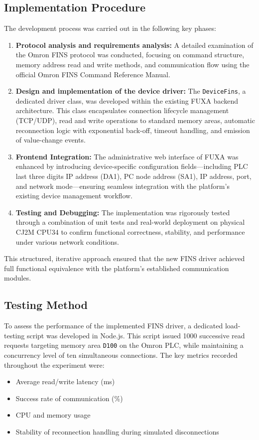 \subsection{Implementation Procedure}

The development process was carried out in the following key phases:

\begin{enumerate}
    \item \textbf{Protocol analysis and requirements analysis:}  
    A detailed examination of the Omron FINS protocol was conducted, focusing on command structure, memory address read and write methods, and communication flow using the official Omron FINS Command Reference Manual.

    \item \textbf{Design and implementation of the device driver:}  
    The \texttt{DeviceFins}, a dedicated driver class, was developed within the existing FUXA backend architecture. This class encapsulates connection lifecycle management (TCP/UDP), read and write operations to standard memory areas, automatic reconnection logic with exponential back-off, timeout handling, and emission of value-change events.

    \item \textbf{Frontend Integration:}  
    The administrative web interface of FUXA was enhanced by introducing device-specific configuration fields—including PLC last three digits IP address (DA1), PC node address (SA1), IP address, port, and network mode—ensuring seamless integration with the platform’s existing device management workflow.

    \item \textbf{Testing and Debugging:}  
    The implementation was rigorously tested through a combination of unit tests and real-world deployment on physical CJ2M CPU34 to confirm functional correctness, stability, and performance under various network conditions.
\end{enumerate}

This structured, iterative approach ensured that the new FINS driver achieved full functional equivalence with the platform’s established communication modules.

\subsection{Testing Method}
To assess the performance of the implemented FINS driver, a dedicated load-testing script was developed in Node.js. This script issued 1000 successive read requests targeting memory area \texttt{D100} on the Omron PLC, while maintaining a concurrency level of ten simultaneous connections. The key metrics recorded throughout the experiment were:
\begin{itemize}
    \item Average read/write latency (ms)
    \item Success rate of communication (\%)
    \item CPU and memory usage
    \item Stability of reconnection handling during simulated disconnections
\end{itemize}


